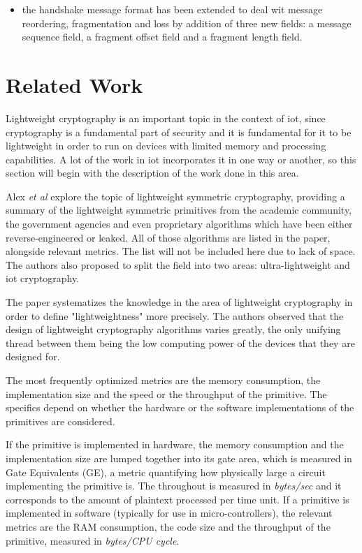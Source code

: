 \documentclass{llncs}
\begin{document}
{\begin{itemize}
  \item the handshake message format has been extended to deal wit message reordering,
  fragmentation and loss by addition of three new fields: a message sequence field,
  a fragment offset field and a fragment length field.
\end{itemize}

\section{Related Work}

Lightweight cryptography is an important topic in the context of \gls{iot}, since
cryptography is a fundamental part of security and it is fundamental for it to be
lightweight in order to run on devices with limited memory and processing
capabilities. A lot of the work in \gls{iot} incorporates it in one way or another,
so this section will begin with the description of the work done in this area.

Alex \textit{et al}\cite{Stateoft96:online} explore the topic of lightweight symmetric cryptography,
providing a summary of the lightweight symmetric
primitives from the academic community, the government agencies and even proprietary
algorithms which have been either reverse-engineered or leaked. All of those algorithms
are listed in the paper, alongside relevant metrics. The list will not be
included here due to lack of space. The authors also proposed
to split the field into two areas: ultra-lightweight and \gls{iot} cryptography.

The paper systematizes the knowledge in the area of lightweight cryptography
in order to define "lightweightness" more precisely. The authors observed that the design
of lightweight cryptography algorithms varies greatly, the only unifying thread
between them being the low computing power of the devices that they are designed for.

The most frequently optimized metrics are the memory consumption, the implementation size
and the speed or the throughput of the primitive. The specifics depend on whether
the hardware or the software implementations of the primitives are considered.

If the primitive is implemented in hardware, the memory consumption and the implementation
size are lumped together into its gate area, which is measured in Gate Equivalents (GE),
a metric quantifying how physically large a circuit implementing the primitive is.
The throughout is measured in \textit{bytes/sec} and it corresponds to the amount of plaintext
processed per time unit. If a primitive is implemented in software (typically for
use in micro-controllers), the relevant metrics are the RAM consumption, the code
size and the throughput of the primitive, measured in \textit{bytes/CPU cycle}.

}
\end{document}
